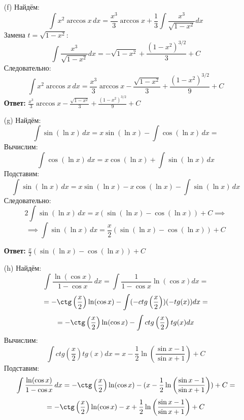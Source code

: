 \documentclass[a4paper]{article}
\renewcommand{\f}[2]{\frac{#1}{#2}}
\renewcommand{\l}{\left(}
\renewcommand{\r}{\right)}
\begin{document}
\begin{enumerate}
\begin{enumerate}
        \item[(f)]Найдём:
        \[
        \int x^2 \arccos x \, dx = \frac{x^3}{3} \arccos x + \frac{1}{3} \int \frac{x^3}{\sqrt{1 - x^2}} dx
        \]
        Замена \(t = \sqrt{1 - x^2}\):
        \[
        \int \frac{x^3}{\sqrt{1 - x^2}} dx = -\sqrt{1 - x^2} + \frac{(1 - x^2)^{3/2}}{3} + C
        \]
        Следовательно:
        \[
        \int x^2 \arccos x \, dx = \frac{x^3}{3} \arccos x - \frac{\sqrt{1 - x^2}}{3} + \frac{(1 - x^2)^{3/2}}{9} + C
        \]
        \textbf{Ответ:} $\frac{x^3}{3} \arccos x - \frac{\sqrt{1 - x^2}}{3} + \frac{(1 - x^2)^{3/2}}{9} + C$\\

        \item[(g)]Найдём:
        \[
        \int \sin(\ln x) \, dx = x \sin(\ln x) - \int \cos(\ln x) \, dx = 
        \]
        Вычислим:
        \[
        \int \cos(\ln x) \, dx = x \cos(\ln x) + \int \sin(\ln x) \, dx
        \]
        Подставим:
        \[
            \int \sin(\ln x) \, dx = x \sin(\ln x) - x \cos(\ln x) - \int \sin(\ln x) \, dx
        \]
        Следовательно:
        $$2\int \sin(\ln x) \, dx = x (\sin(\ln x) - \cos(\ln x)) + C\implies$$
        $$ \implies \int \sin(\ln x) \, dx = \frac{x}{2} \left( \sin(\ln x) - \cos(\ln x) \right) + C$$
    
        \textbf{Ответ: } $\frac{x}{2} \left( \sin(\ln x) - \cos(\ln x) \right) + C$\\

        \item[(h)]Найдём:
        $$\int \frac{\ln(\cos x)}{1 - \cos x} \, dx = \int \f{1}{1-\cos{x}} \ln(\cos x) dx = $$
        $$=-\ctg\l\f{x}{2}\r\ln(\cos{x}) - \int (-ctg\l\f{x}{2}\r)(-tg(x)) dx= $$
        $$=-\ctg\l\f{x}{2}\r\ln(\cos{x}) - \int ctg\l\f{x}{2}\r tg(x) dx$$
        Вычислим:
        $$\int ctg\l\f{x}{2}\r tg(x) dx = x- \f{1}{2}\ln \l \f{\sin x - 1}{\sin x + 1} \r + C$$
        Подставим:
        $$\int \frac{\ln(\cos x)}{1 - \cos x} \, dx = -\ctg\l\f{x}{2}\r\ln(\cos{x}) - (x- \f{1}{2}\ln \l \f{\sin x - 1}{\sin x + 1} \r) + C = $$
        $$=-\ctg\l\f{x}{2}\r\ln(\cos{x}) - x + \f{1}{2}\ln \l \f{\sin x - 1}{\sin x + 1} \r + C$$
    \end{enumerate}
\end{enumerate}
\end{document}
